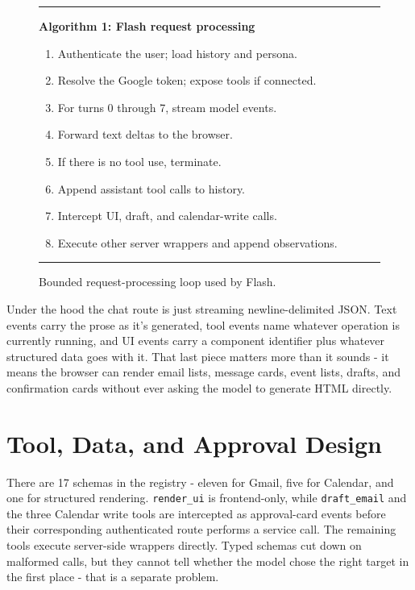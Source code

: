 \documentclass[conference]{IEEEtran}
\begin{document}
\begin{figure}[t]
\small
\hrule
\vspace{0.3em}
\textbf{Algorithm 1: Flash request processing}
\begin{enumerate}[leftmargin=1.4em,label=\arabic*.,itemsep=0pt]
    \item Authenticate the user; load history and persona.
    \item Resolve the Google token; expose tools if connected.
    \item For turns 0 through 7, stream model events.
    \item Forward text deltas to the browser.
    \item If there is no tool use, terminate.
    \item Append assistant tool calls to history.
    \item Intercept UI, draft, and calendar-write calls.
    \item Execute other server wrappers and append observations.
\end{enumerate}
\vspace{0.2em}
\hrule
\caption{Bounded request-processing loop used by Flash.}
\label{fig:algorithm}
\end{figure}

Under the hood the chat route is just streaming newline-delimited JSON. Text events carry the prose as it's generated, tool events name whatever operation is currently running, and UI events carry a component identifier plus whatever structured data goes with it. That last piece matters more than it sounds - it means the browser can render email lists, message cards, event lists, drafts, and confirmation cards without ever asking the model to generate HTML directly.

\section{Tool, Data, and Approval Design}

There are 17 schemas in the registry - eleven for Gmail, five for Calendar, and one for structured rendering. \texttt{render\_ui} is frontend-only, while \texttt{draft\_email} and the three Calendar write tools are intercepted as approval-card events before their corresponding authenticated route performs a service call. The remaining tools execute server-side wrappers directly. Typed schemas cut down on malformed calls, but they cannot tell whether the model chose the right target in the first place - that is a separate problem.
\end{document}
